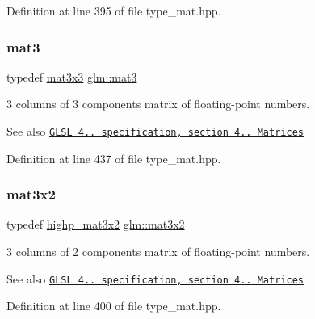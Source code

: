 Definition at line 395 of file type\+\_\+mat.\+hpp.

\mbox{\label{group__core__types_gadfaff2a7dce5cbf4e77a47ecea42ac5b}} 
\subsubsection{\texorpdfstring{mat3}{mat3}}
{\footnotesize\ttfamily typedef \hyperlink{group__core__types_ga6fecca6a869070b6bf8acb44ce1c2af3}{mat3x3} \hyperlink{group__core__types_gadfaff2a7dce5cbf4e77a47ecea42ac5b}{glm\+::mat3}}

3 columns of 3 components matrix of floating-\/point numbers.

\begin{DoxySeeAlso}{See also}
\href{http://www.opengl.org/registry/doc/GLSLangSpec.4.20.8.pdf}{\tt G\+L\+SL 4.. specification, section 4.. Matrices} 
\end{DoxySeeAlso}


Definition at line 437 of file type\+\_\+mat.\+hpp.

\mbox{\label{group__core__types_gad7476e0e866186f12ee87975c6b01552}} 
\subsubsection{\texorpdfstring{mat3x2}{mat3x2}}
{\footnotesize\ttfamily typedef \hyperlink{group__core__precision_gabc7767293ff69cd56717ee9d8be62963}{highp\+\_\+mat3x2} \hyperlink{group__core__types_gad7476e0e866186f12ee87975c6b01552}{glm\+::mat3x2}}

3 columns of 2 components matrix of floating-\/point numbers.

\begin{DoxySeeAlso}{See also}
\href{http://www.opengl.org/registry/doc/GLSLangSpec.4.20.8.pdf}{\tt G\+L\+SL 4.. specification, section 4.. Matrices} 
\end{DoxySeeAlso}


Definition at line 400 of file type\+\_\+mat.\+hpp.

\mbox{\label{group__core__types_ga6fecca6a869070b6bf8acb44ce1c2af3}} 
